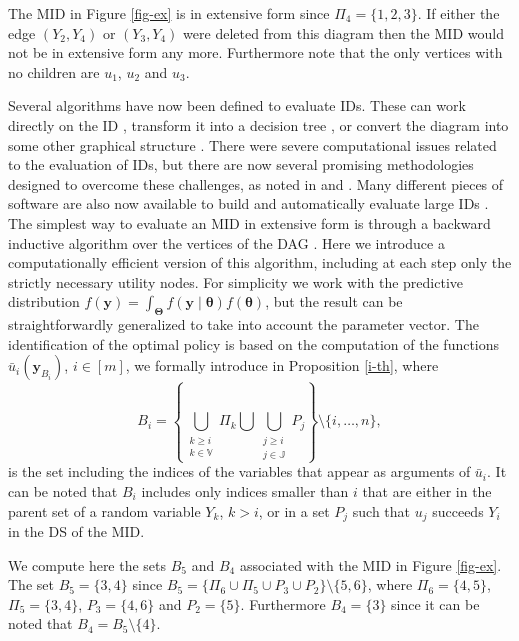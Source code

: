 \begin{example}
The \gls{MID} in Figure \ref{fig-ex} is in extensive form since $\Pi_4=\{1,2,3\}$. If either the edge $(Y_2,Y_4)$ or $(Y_3,Y_4)$ were deleted from this diagram then the \gls{MID} would not be in extensive form any more. Furthermore note that the only vertices with no children are $u_1$, $u_2$ and $u_3$. 
\end{example}

Several algorithms have now been defined to evaluate \glspl{ID}. These can work directly on the \gls{ID} \citep{Shachter1986,Olmsted1983}, transform it into a decision tree \citep{Canbolat2007}, or convert the diagram into some other graphical structure \citep{Jensen1994,Madsen1999}. There were severe computational issues related to the evaluation of \glspl{ID}, but there are now several  promising methodologies designed to overcome these challenges, as noted in \citet{Bielza2011} and \citet{Gomez2007}. Many different pieces of software are also now available to build and automatically evaluate large \glspl{ID} \citep{Jensen2013}. The simplest way to evaluate an \gls{MID} in extensive form is through a backward inductive algorithm over the vertices of the \gls{DAG} \citep[see e.g.][]{Jensen2009}. Here we introduce a computationally efficient version of this algorithm, including at each step only the strictly necessary utility nodes. For simplicity we work with the predictive distribution $f(\bm{y})=\int_{\bm{\Theta}}f(\bm{y}\;|\;\bm{\theta})f(\bm{\theta})$, but the result can be straightforwardly generalized to take into account the parameter vector.  The identification of the optimal policy is based on the computation of the functions $\bar{u}_i(\bm{y}_{B_i})$, $i\in[m]$, we formally introduce in Proposition \ref{i-th}, where 
\begin{equation*}
\label{Ai}
B_i=\left\{\bigcup_{\substack{k\geq i\\ k\in\mathbb{V}}}\Pi_k\bigcup\bigcup_{\substack{j\geq i\\j\in\mathbb{J}}}P_j\right\}\setminus\{i,\dots,n\},
\end{equation*}
is the set including the indices of the variables that appear as arguments of $\bar{u}_i$. It can be noted that $B_i$ includes only indices smaller than $i$ that are either in the parent set of a random variable $Y_k$, $k>i$, or in a set $P_j$ such that $u_j$ succeeds $Y_i$ in the \gls{DS} of the \gls{MID}.

\begin{example}
We compute here the sets $B_5$ and $B_4$ associated with the \gls{MID} in Figure \ref{fig-ex}. The set $B_5=\{3,4\}$ since $B_5=\{\Pi_6\cup \Pi_5\cup P_3\cup P_2\}\setminus\{5,6\}$, where $\Pi_6=\{4,5\}$, $\Pi_5=\{3,4\}$, $P_3=\{4,6\}$ and $P_2=\{5\}$. Furthermore $B_4=\{3\}$ since it can be noted that $B_4=B_5\setminus \{4\}$.
\end{example}

